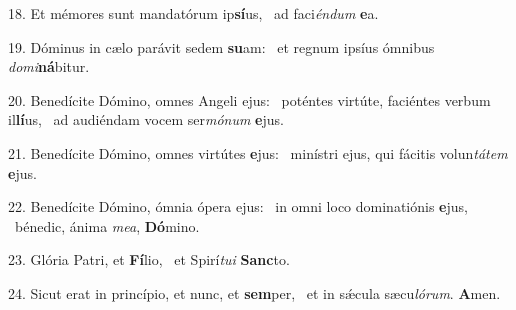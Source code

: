18. Et mémores sunt mandatórum ip\textbf{sí}us, \ast\  ad faci\textit{én}\textit{dum} \textbf{e}a.\

19. Dóminus in cælo parávit sedem \textbf{su}am: \ast\  et regnum ipsíus ómnibus \textit{do}\textit{mi}\textbf{ná}bitur.\

20. Benedícite Dómino, omnes Angeli ejus: \dag\  poténtes virtúte, faciéntes verbum il\textbf{lí}us, \ast\  ad audiéndam vocem ser\textit{mó}\textit{num} \textbf{e}jus.\

21. Benedícite Dómino, omnes virtútes \textbf{e}jus: \ast\  minístri ejus, qui fácitis volun\textit{tá}\textit{tem} \textbf{e}jus.\

22. Benedícite Dómino, ómnia ópera ejus: \dag\  in omni loco dominatiónis \textbf{e}jus, \ast\  bénedic, ánima \textit{me}\textit{a}, \textbf{Dó}mino.\

23. Glória Patri, et \textbf{Fí}lio, \ast\  et Spirí\textit{tu}\textit{i} \textbf{Sanc}to.\

24. Sicut erat in princípio, et nunc, et \textbf{sem}per, \ast\  et in sǽcula sæcu\textit{ló}\textit{rum}. \textbf{A}men.\

